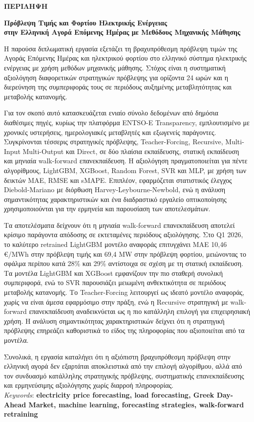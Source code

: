 \begin{center}  \Large{\textbf{ΠΕΡΙΛΗΨΗ}}  \end{center}
\begin{center}  \Large{\textbf{Πρόβλεψη Τιμής και Φορτίου Ηλεκτρικής Ενέργειας\\
στην Ελληνική Αγορά Επόμενης Ημέρας με Μεθόδους Μηχανικής Μάθησης}}  \end{center}
\vspace{3pt}
\vspace{10pt}
\noindent
Η παρούσα διπλωματική εργασία εξετάζει τη βραχυπρόθεσμη πρόβλεψη τιμών της Αγοράς Επόμενης Ημέρας και ηλεκτρικού φορτίου στο ελληνικό σύστημα ηλεκτρικής ενέργειας με χρήση μεθόδων μηχανικής μάθησης. Στόχος είναι η συστηματική αξιολόγηση διαφορετικών στρατηγικών πρόβλεψης για ορίζοντα 24 ωρών και η διερεύνηση της συμπεριφοράς τους σε περιόδους αυξημένης μεταβλητότητας και μεταβολής κατανομής.

Για τον σκοπό αυτό κατασκευάζεται ενιαίο σύνολο δεδομένων από δημόσια διαθέσιμες πηγές, κυρίως την πλατφόρμα ENTSO-E Transparency, εμπλουτισμένο με χρονικές υστερήσεις, ημερολογιακές μεταβλητές και εξωγενείς παράγοντες. Συγκρίνονται τέσσερις στρατηγικές πρόβλεψης, Teacher-Forcing, Recursive, Multi-Input Multi-Output και Direct, σε δύο πλαίσια εκπαίδευσης, στατική εκπαίδευση και μηνιαία walk-forward επανεκπαίδευση. Η αξιολόγηση πραγματοποιείται για πέντε αλγορίθμους, LightGBM, XGBoost, Random Forest, SVR και MLP, με χρήση των δεικτών MAE, RMSE και sMAPE. Επιπλέον, εφαρμόζεται στατιστικός έλεγχος Diebold-Mariano με διόρθωση Harvey-Leybourne-Newbold, ενώ η ανάλυση σημαντικότητας χαρακτηριστικών και ένα διαδραστικό εργαλείο οπτικοποίησης χρησιμοποιούνται για την ερμηνεία και παρουσίαση των αποτελεσμάτων.

Τα αποτελέσματα δείχνουν ότι η μηνιαία walk-forward επανεκπαίδευση αποτελεί κρίσιμο παράγοντα απόδοσης σε εκτεταμένες περιόδους αξιολόγησης. Στο Q1 2026, το καλύτερο retrained LightGBM μοντέλο αναφοράς επιτυγχάνει MAE 10,46 €/MWh στην πρόβλεψη τιμής και 69,4 MW στην πρόβλεψη φορτίου, μειώνοντας το σφάλμα περίπου κατά 28\% και 29\% αντίστοιχα σε σχέση με τη στατική εκπαίδευση. Τα μοντέλα LightGBM και XGBoost εμφανίζουν την πιο σταθερή συνολική συμπεριφορά, ενώ το SVR παρουσιάζει μειωμένη ανθεκτικότητα σε περιόδους μεταβολής κατανομής. Το Teacher-Forcing λειτουργεί ως ιδεατό μοντέλο αναφοράς, χωρίς να είναι άμεσα εφαρμόσιμο στην πράξη, ενώ η Recursive στρατηγική με walk-forward επανεκπαίδευση αναδεικνύεται ως η πιο κατάλληλη επιλογή για επιχειρησιακή χρήση. Η ανάλυση σημαντικότητας χαρακτηριστικών δείχνει ότι η στρατηγική πρόβλεψης επηρεάζει καθοριστικά το είδος της πληροφορίας που αξιοποιείται από τα μοντέλα.

Συνολικά, η εργασία καταλήγει ότι η αξιόπιστη βραχυπρόθεσμη πρόβλεψη στην ελληνική αγορά δεν εξαρτάται αποκλειστικά από την επιλογή αλγορίθμου, αλλά από τον συνδυασμό κατάλληλης στρατηγικής πρόβλεψης, συστηματικής επανεκπαίδευσης και ερμηνεύσιμης αξιολόγησης χωρίς διαρροή πληροφορίας.
\vspace{0.3cm}
\\ \textit{Keywords}: \textbf{electricity price forecasting, load forecasting, Greek Day-Ahead Market, machine learning, forecasting strategies, walk-forward retraining}